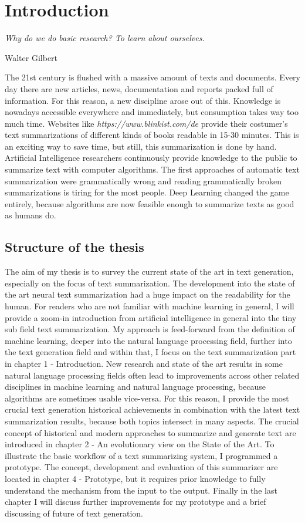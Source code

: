 \chapter{Introduction}\label{ch:intro}

\epigraph{\textit{Why do we do basic research? To learn about ourselves.}}{Walter Gilbert}

The 21st century is flushed with a massive amount of texts and documents. Every day there are new articles, news, documentation and reports packed full of information. For this reason, a new discipline arose out of this. Knowledge is nowadays accessible everywhere and immediately, but consumption takes way too much time. Websites like \textit{https://www.blinkist.com/de} provide their costumer's text summarizations of different kinds of books readable in 15-30 minutes. This is an exciting way to save time, but still, this summarization is done by hand. Artificial Intelligence researchers continuously provide knowledge to the public to summarize text with computer algorithms. The first approaches of automatic text summarization were grammatically wrong and reading grammatically broken summarizations is tiring for the most people. Deep Learning changed the game entirely, because algorithms are now feasible enough to summarize texts as good as humans do.

\section{Structure of the thesis}
The aim of my thesis is to survey the current state of the art in text generation, especially on the focus of text summarization. The development into the state of the art neural text summarization had a huge impact on the readability for the human. For readers who are not familiar with machine learning in general, I will provide a zoom-in introduction from artificial intelligence in general into the tiny sub field text summarization. My approach is feed-forward from the definition of machine learning, deeper into the natural language processing field, further into the text generation field and within that, I focus on the text summarization part in chapter 1 - Introduction. New research and state of the art results in some natural language processing fields often lead to improvements across other related disciplines in machine learning and natural language processing, because algorithms are sometimes usable vice-versa. For this reason, I provide the most crucial text generation historical achievements in combination with the latest text summarization results, because both topics intersect in many aspects. The crucial concept of historical and modern approaches to summarize and generate text are introduced in chapter 2 - An evolutionary view on the State of the Art. 
To illustrate the basic workflow of a text summarizing system, I programmed a prototype. The concept, development and evaluation of this summarizer are located in chapter 4 - Prototype, but it requires prior knowledge to fully understand the mechanism from the input to the output. Finally in the last chapter I will discuss further improvements for my prototype and a brief discussing of future of text generation.


